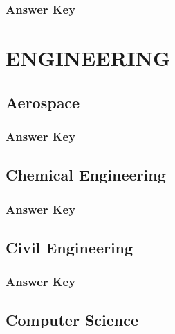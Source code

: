 \documentclass[12pt,a4paper]{book}
\begin{document}


\subsection*{Answer Key}



\chapter{ENGINEERING}

\section{Aerospace}



\subsection*{Answer Key}



\section{Chemical Engineering}



\subsection*{Answer Key}



\section{Civil Engineering}



\subsection*{Answer Key}



\section{Computer Science}
\end{document}

